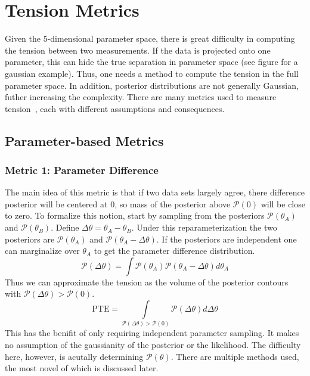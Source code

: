 \section{Tension Metrics}
Given the 5-dimensional parameter space, there is great difficulty in computing the tension between two measurements. If the data is projected onto one parameter, this can hide the true separation in parameter space (see figure for a gaussian example). Thus, one needs a method to compute the tension in the full parameter space. In addition, posterior distributions are not generally Gaussian, futher increasing the complexity. There are many metrics used to measure tension~\cite{lemos_assessing_2021}, each with different assumptions and consequences.
\subsection{Parameter-based Metrics}\label{sec:tenion_metrics}
\subsubsection{Metric 1: Parameter Difference}
The main idea of this metric is that if two data sets largely agree, there difference posterior will be centered at 0, so mass of the posterior above $\mathcal{P}(0)$ will be close to zero. To formalize this notion, start by sampling from the posteriors $\mathcal{P}(\theta_A)$ and $\mathcal{P}(\theta_B)$.
Define $\Delta\theta = \theta_A - \theta_B$. Under this reparameterization the two posteriors are $\mathcal{P}(\theta_A)$ and $\mathcal{P}(\theta_A-\Delta\theta)$. If the posteriors are independent one can marginalize over $\theta_A$ to get the parameter difference distribution.
\begin{equation}
    \mathcal{P}(\Delta\theta) = \int \mathcal{P}(\theta_A)\mathcal{P}(\theta_A - \Delta\theta) d\theta_A
\end{equation}
Thus we can approximate the tension as the volume of the posterior contours with $\mathcal{P}(\Delta\theta)>\mathcal{P}(0)$.
\begin{equation}
    \mathrm{PTE} = \int\limits_{\mathcal{P}(\Delta\theta)>\mathcal{P}(0)}\mathcal{P}(\Delta\theta) d\Delta\theta
\end{equation}
This has the benifit of only requiring independent parameter sampling. It makes no assumption of the gaussianity of the posterior or the likelihood. The difficulty here, however, is acutally determining $\mathcal{P}(\theta)$. There are multiple methods used, the most novel of which is discussed later.


